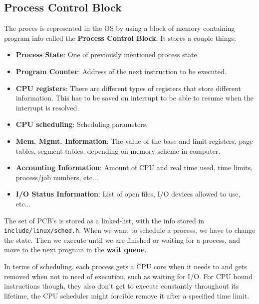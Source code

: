 \documentclass{tufte-handout}
\begin{document}
\subsection{Process Control Block}
The proces is represented in the OS by using a block of memory containing program info called
the \textbf{Process Control Block}. It stores a couple things:
\begin{itemize}
	\item \textbf{Process State}: One of previously mentioned process state.
	\item \textbf{Program Counter}: Address of the next instruction to be executed.
	\item \textbf{CPU registers}: There are different types of registers that store different
				information. This has to be saved on interrupt to be able to resume when the 
				interrupt is resolved.
	\item \textbf{CPU scheduling}: Scheduling parameters.
	\item \textbf{Mem. Mgmt. Information}: The value of the base and limit registers, page tables, 
				segment tables, depending on memory scheme in computer.
	\item \textbf{Accounting Information}: Amount of CPU and real time used, time limits, 
				process/job numbers, etc...
	\item \textbf{I/O Status Information}: List of open files, I/O devices allowed to use, etc...
\end{itemize}

The set of PCB's is stored as a linked-list, with the info stored in \texttt{include/linux/sched.h}.
When we want to schedule a process, we have to change the state. Then we execute until we are
finished or waiting for a process, and move to the next program in the \textbf{wait queue}.

In terms of scheduling, each process gets a CPU core when it needs to and gets removed when 
not in need of execution, such as waiting for I/O. For CPU bound instructions though, they also 
don't get to execute constantly throughout its lifetime, the CPU scheduler might forcible remove
it after a specified time limit. 
\end{document}
